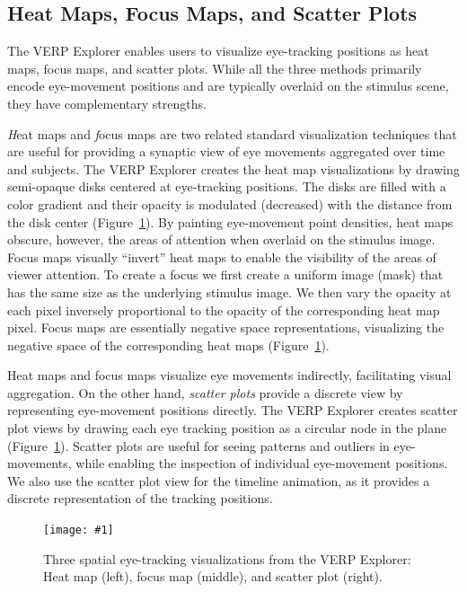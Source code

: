 \documentclass[journal]{vgtc}                %
\newcommand{\insertpicture}[2]{\begin{center}\texttt{[image: \#1]}\end{center}}
\begin{document}
\subsection{Heat Maps, Focus Maps, and Scatter Plots} 

The VERP Explorer enables users to visualize eye-tracking positions 
as heat maps, focus maps, and scatter plots. While all the three
methods primarily encode eye-movement positions and are typically 
overlaid on the stimulus scene, they have complementary strengths.  

{\emph Heat maps} and {\emph focus maps} are two related standard 
visualization techniques that are useful for providing a synaptic view of 
eye movements aggregated over time and subjects. The VERP Explorer creates 
the heat map visualizations by drawing semi-opaque disks centered at 
eye-tracking positions. The disks are filled with a color gradient and 
their opacity is modulated (decreased) with the distance from the disk 
center (Figure~\ref{fig:spatial}). By painting eye-movement point densities, 
heat maps obscure, however, the areas of attention when overlaid on the 
stimulus image. Focus maps visually “invert” heat maps to enable the  
visibility of the areas of viewer attention. To create a focus we  
first create a uniform
image (mask) that has the same size as the underlying stimulus image. We 
then vary the opacity at each pixel inversely proportional to the opacity 
of the corresponding heat map pixel. Focus maps are essentially negative 
space representations, visualizing the negative space of the corresponding 
heat maps (Figure~\ref{fig:spatial}). 

Heat maps and focus maps visualize eye movements indirectly, facilitating
visual aggregation. On the other hand, {\em scatter plots} provide a
discrete view by representing eye-movement positions directly. The VERP
Explorer creates scatter plot views by drawing each eye tracking position
as a circular node in the plane (Figure~\ref{fig:spatial}). Scatter plots 
are useful for
seeing patterns and outliers in eye-movements, while enabling the
inspection of individual eye-movement positions. We also use the scatter
plot view for the timeline animation, as it provides a  discrete
representation of the tracking positions.

\begin{figure}
	\insertpicture{figures/spatial.pdf}{0.9}
	\caption{ Three spatial eye-tracking visualizations from the VERP
		Explorer: Heat map (left), focus map (middle), and scatter plot
		(right). \label{fig:spatial} }

\end{figure}
\end{document}
